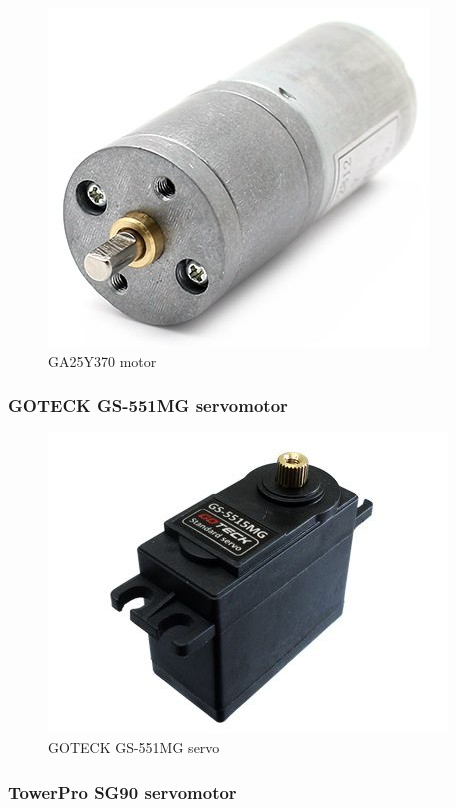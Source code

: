 		\begin{figure}[H]
			\centering
			\includegraphics[scale=0.4]{images/ProjectComponents/motor.jpg}
			\caption{GA25Y370 motor }
			\label{}
	\end{figure}
	\bigskip

	\subsubsection{GOTECK GS-551MG servomotor}

		\begin{figure}[H]
			\centering
			\includegraphics[scale=0.5]{images/ProjectComponents/servo1.jpg}
			\caption{GOTECK GS-551MG servo }
			\label{}
	\end{figure}
	\bigskip


	\subsubsection{TowerPro SG90 servomotor}

